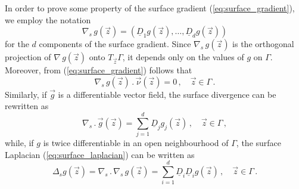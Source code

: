 In order to prove some property of the surface gradient
(\ref{eq:surface_gradient}), we employ the notation
\begin{equation}
\nabla_s \, g(\vec z) = (\underline{D}_1 g(\vec z), \hdots, \underline{D}_{d}
g(\vec z))
\end{equation}
for the $d$ components of the surface gradient. Since $\nabla_s \, g(\vec z)$
is the orthogonal projection of $\nabla \, g(\vec z)$ onto $T_{\vec z} \Gamma$,
it depends only on the values of $g$ on $\Gamma$. Moreover, from
(\ref{eq:surface_gradient}) follows that
\begin{equation}\label{eq:surface_gradient_comp}
\nabla_s \, g(\vec z) \,.\, \vec \nu(\vec z)=0\,, \quad \vec z \in \Gamma\,.
\end{equation}
Similarly, if $\vec g$ is a differentiable vector field, the surface divergence
can be rewritten as
\begin{equation}
\nabla_s \,.\, \vec g(\vec z) = \sum_{j = 1}^d \underline{D}_j g_j (\vec z)\,,
\quad \vec z \in \Gamma\,,
\end{equation}
while, if $g$ is twice differentiable in an open neighbourhood of
$\Gamma$, the surface Laplacian (\ref{eq:surface_laplacian}) can be written as
\begin{equation}\label{eq:surface_laplacian_comp}
\Delta_s g(\vec z) = \nabla_s\, . \,\nabla_s \, g(\vec z) =
\sum_{i = 1}^d \underline{D}_i \underline{D}_i g(\vec z) \, ,
\quad \vec z \in \Gamma \,.
\end{equation}

